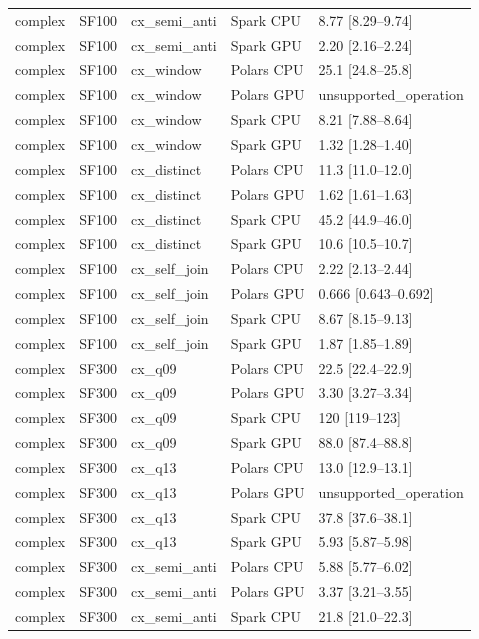 \begin{longtable}{lllll}
complex & SF100 & cx\_semi\_anti & Spark CPU & 8.77 [8.29--9.74] \\
complex & SF100 & cx\_semi\_anti & Spark GPU & 2.20 [2.16--2.24] \\
complex & SF100 & cx\_window & Polars CPU & 25.1 [24.8--25.8] \\
complex & SF100 & cx\_window & Polars GPU & unsupported\_operation \\
complex & SF100 & cx\_window & Spark CPU & 8.21 [7.88--8.64] \\
complex & SF100 & cx\_window & Spark GPU & 1.32 [1.28--1.40] \\
complex & SF100 & cx\_distinct & Polars CPU & 11.3 [11.0--12.0] \\
complex & SF100 & cx\_distinct & Polars GPU & 1.62 [1.61--1.63] \\
complex & SF100 & cx\_distinct & Spark CPU & 45.2 [44.9--46.0] \\
complex & SF100 & cx\_distinct & Spark GPU & 10.6 [10.5--10.7] \\
complex & SF100 & cx\_self\_join & Polars CPU & 2.22 [2.13--2.44] \\
complex & SF100 & cx\_self\_join & Polars GPU & 0.666 [0.643--0.692] \\
complex & SF100 & cx\_self\_join & Spark CPU & 8.67 [8.15--9.13] \\
complex & SF100 & cx\_self\_join & Spark GPU & 1.87 [1.85--1.89] \\
complex & SF300 & cx\_q09 & Polars CPU & 22.5 [22.4--22.9] \\
complex & SF300 & cx\_q09 & Polars GPU & 3.30 [3.27--3.34] \\
complex & SF300 & cx\_q09 & Spark CPU & 120 [119--123] \\
complex & SF300 & cx\_q09 & Spark GPU & 88.0 [87.4--88.8] \\
complex & SF300 & cx\_q13 & Polars CPU & 13.0 [12.9--13.1] \\
complex & SF300 & cx\_q13 & Polars GPU & unsupported\_operation \\
complex & SF300 & cx\_q13 & Spark CPU & 37.8 [37.6--38.1] \\
complex & SF300 & cx\_q13 & Spark GPU & 5.93 [5.87--5.98] \\
complex & SF300 & cx\_semi\_anti & Polars CPU & 5.88 [5.77--6.02] \\
complex & SF300 & cx\_semi\_anti & Polars GPU & 3.37 [3.21--3.55] \\
complex & SF300 & cx\_semi\_anti & Spark CPU & 21.8 [21.0--22.3] \\

\end{longtable}
